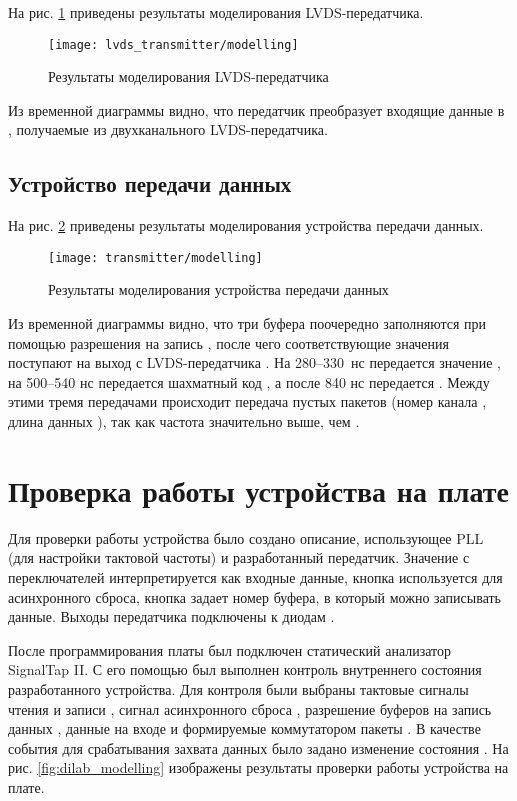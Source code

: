 На рис. \ref{fig:lvds_transmitter_modelling} приведены результаты моделирования LVDS-передатчика.
\begin{figure}[H]
	\centering
	\texttt{[image: lvds\_transmitter/modelling]}
	\caption{Результаты моделирования LVDS-передатчика}
	\label{fig:lvds_transmitter_modelling}
\end{figure}

Из временной диаграммы видно, что передатчик преобразует входящие данные  в , получаемые из двухканального LVDS-передатчика.

\subsection{Устройство передачи данных}

На рис. \ref{fig:transmitter_modelling} приведены результаты моделирования устройства передачи данных.
\begin{figure}[H]
	\centering
	\texttt{[image: transmitter/modelling]}
	\caption{Результаты моделирования устройства передачи данных}
	\label{fig:transmitter_modelling}
\end{figure}

Из временной диаграммы видно, что три буфера поочередно заполняются при помощью разрешения на запись , после чего соответствующие значения поступают на выход с LVDS-передатчика . На 280--330~нс передается значение , на 500--540 нс передается шахматный код , а после 840 нс передается . Между этими тремя передачами происходит передача пустых пакетов (номер канала , длина данных ), так как частота  значительно выше, чем .

\section{Проверка работы устройства на плате}

Для проверки работы устройства было создано описание, использующее PLL (для настройки тактовой частоты) и разработанный передатчик. Значение с переключателей  интерпретируется как входные данные, кнопка  используется для асинхронного сброса, кнопка  задает номер буфера, в который можно записывать данные. Выходы передатчика подключены к диодам .

После программирования платы был подключен статический анализатор SignalTap II. С его помощью был выполнен контроль внутреннего состояния разработанного устройства. Для контроля были выбраны тактовые сигналы чтения  и записи , сигнал асинхронного сброса , разрешение буферов на запись данных , данные на входе  и формируемые коммутатором пакеты . В качестве события для срабатывания захвата данных было задано изменение состояния . На рис. \ref{fig:dilab_modelling} изображены результаты проверки работы устройства на плате.

